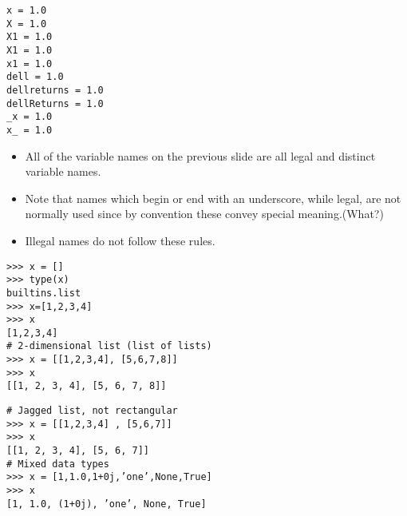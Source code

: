 \documentclass[KSmainSlides.tex]{subfiles}
\begin{document}
\begin{frame}[fragile]
\begin{framed}
\begin{verbatim}
x = 1.0
X = 1.0
X1 = 1.0
X1 = 1.0
x1 = 1.0
dell = 1.0
dellreturns = 1.0
dellReturns = 1.0
_x = 1.0
x_ = 1.0
\end{verbatim}
\end{framed}
\end{frame}
\begin{frame}[fragile]
\begin{itemize}
\item All of the variable names on the previous slide are all legal and distinct variable names. 
\item Note that names which begin or end with an underscore, while
legal, are not normally used since by convention these convey special meaning.(What?)\item  Illegal names do not
follow these rules.
\end{itemize}

\end{frame}
\begin{frame}[fragile]

\begin{framed}
\begin{verbatim}
>>> x = []
>>> type(x)
builtins.list
>>> x=[1,2,3,4]
>>> x
[1,2,3,4]
# 2-dimensional list (list of lists)
>>> x = [[1,2,3,4], [5,6,7,8]]
>>> x
[[1, 2, 3, 4], [5, 6, 7, 8]]

\end{verbatim}
\end{framed}

\end{frame}
\begin{frame}[fragile]
\begin{framed}
\begin{verbatim}
# Jagged list, not rectangular
>>> x = [[1,2,3,4] , [5,6,7]]
>>> x
[[1, 2, 3, 4], [5, 6, 7]]
# Mixed data types
>>> x = [1,1.0,1+0j,’one’,None,True]
>>> x
[1, 1.0, (1+0j), ’one’, None, True]

\end{verbatim}
\end{framed}

\end{frame}
\end{document}
